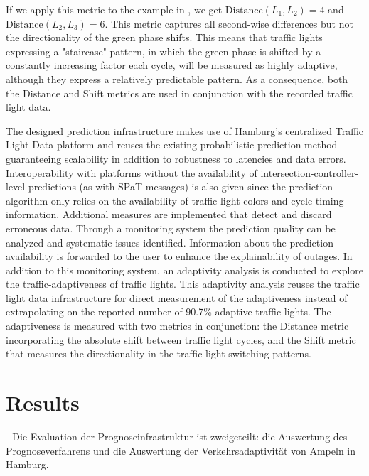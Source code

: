 If we apply this metric to the example in , we get $\text{Distance}$$(L_1, L_2)$$ = 4$ and $\text{Distance}$$(L_2, L_3)$$ = 6$. This metric captures all second-wise differences but not the directionality of the green phase shifts. This means that traffic lights expressing a "staircase" pattern, in which the green phase is shifted by a constantly increasing factor each cycle, will be measured as highly adaptive, although they express a relatively predictable pattern. As a consequence, both the Distance and Shift metrics are used in conjunction with the recorded traffic light data.

\begin{Summary}
The designed prediction infrastructure makes use of Hamburg's centralized Traffic Light Data platform and reuses the existing probabilistic prediction method  \cite{pape_untersuchung_2012, protschky_extensive_2014, protschky_adaptive_2014} guaranteeing scalability in addition to robustness to latencies and data errors. Interoperability with platforms without the availability of intersection-controller-level predictions (as with SPaT messages) is also given since the prediction algorithm only relies on the availability of traffic light colors and cycle timing information. Additional measures are implemented that detect and discard erroneous data. Through a monitoring system the prediction quality can be analyzed and systematic issues identified. Information about the prediction availability is forwarded to the user to enhance the explainability of outages. In addition to this monitoring system, an adaptivity analysis is conducted to explore the traffic-adaptiveness of traffic lights. This adaptivity analysis reuses the traffic light data infrastructure for direct measurement of the adaptiveness instead of extrapolating on the reported number of 90.7\% adaptive traffic lights. The adaptiveness is measured with two metrics in conjunction: the Distance metric incorporating the absolute shift between traffic light cycles, and the Shift metric that measures the directionality in the traffic light switching patterns.
\end{Summary}

\section{Results}

- Die Evaluation der Prognoseinfrastruktur ist zweigeteilt: die Auswertung des Prognoseverfahrens und die Auswertung der Verkehrsadaptivität von Ampeln in Hamburg.

